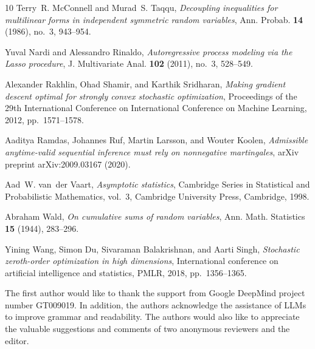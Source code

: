 \documentclass[ECP]{ejpecp} %
\begin{document}
\begin{thebibliography}{10}
Terry~R. McConnell and Murad~S. Taqqu, \emph{Decoupling inequalities for multilinear forms in independent symmetric random variables}, Ann. Probab. \textbf{14} (1986), no.~3, 943--954. 

Yuval Nardi and Alessandro Rinaldo, \emph{Autoregressive process modeling via the {L}asso procedure}, J. Multivariate Anal. \textbf{102} (2011), no.~3, 528--549. 

Alexander Rakhlin, Ohad Shamir, and Karthik Sridharan, \emph{Making gradient descent optimal for strongly convex stochastic optimization}, Proceedings of the 29th International Conference on International Conference on Machine Learning, 2012, pp.~1571--1578.

Aaditya Ramdas, Johannes Ruf, Martin Larsson, and Wouter Koolen, \emph{Admissible anytime-valid sequential inference must rely on nonnegative martingales}, arXiv preprint arXiv:2009.03167 (2020).

Aad~W. van~der Vaart, \emph{Asymptotic statistics}, Cambridge Series in Statistical and Probabilistic Mathematics, vol.~3, Cambridge University Press, Cambridge, 1998. 

Abraham Wald, \emph{On cumulative sums of random variables}, Ann. Math. Statistics \textbf{15} (1944), 283--296. 

Yining Wang, Simon Du, Sivaraman Balakrishnan, and Aarti Singh, \emph{Stochastic zeroth-order optimization in high dimensions}, International conference on artificial intelligence and statistics, PMLR, 2018, pp.~1356--1365.

\end{thebibliography}


\begin{acks}
The first author would like to thank the support from Google DeepMind project number GT009019. In addition, the authors acknowledge the assistance of LLMs to improve grammar and readability. The authors would also like to appreciate the valuable suggestions and comments of two anonymous reviewers and the editor.
\end{acks}

\end{document}

